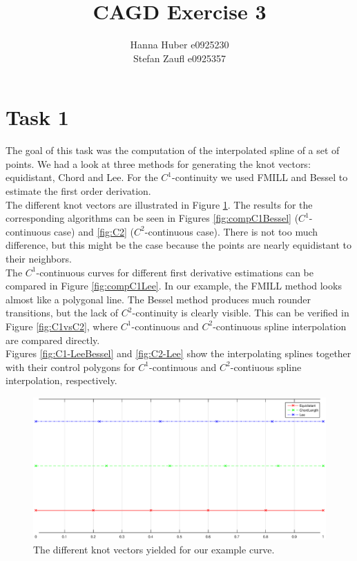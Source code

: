 \documentclass[12pt,a4paper]{article}
\title{CAGD Exercise 3}
\author{Hanna Huber e0925230\\Stefan Zaufl e0925357}
\begin{document}
\maketitle
\section{Task 1}
The goal of this task was the computation of the interpolated spline of a set of points. We had a look at three methods for generating the knot vectors: equidistant, Chord and Lee. For the $C^1$-continuity we used FMILL and Bessel to estimate the first order derivation. \\
The different knot vectors are illustrated in Figure \ref{fig:knotvec}. The results for the corresponding algorithms can be seen in Figures \ref{fig:compC1Bessel} ($C^1$-continuous case) and \ref{fig:C2} ($C^2$-continuous case). There is not too much difference, but this might be the case because the points are nearly equidistant to their neighbors. \\
The $C^1$-continuous curves for different first derivative estimations can be compared in Figure \ref{fig:compC1Lee}. In our example, the FMILL method looks almost like a polygonal line. The Bessel method produces much rounder transitions, but the lack of $C^2$-continuity is clearly visible. This can be verified in Figure \ref{fig:C1vsC2}, where $C^1$-continuous and $C^2$-continuous spline interpolation are compared directly.  \\
Figures \ref{fig:C1-LeeBessel} and \ref{fig:C2-Lee} show the interpolating splines together with their control polygons for $C^1$-continuous and $C^2$-contiuous spline interpolation, respectively. 


\begin{figure}[hbtp]
\centering
\includegraphics[width=\textwidth]{knotvectors.eps}
\caption{The different knot vectors yielded for our example curve.}
\label{fig:knotvec}
\end{figure}
\end{document}
